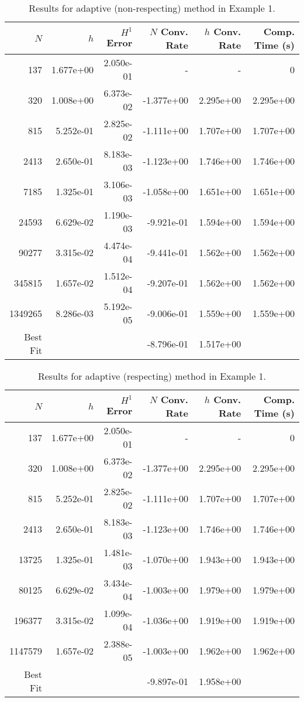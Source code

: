 \documentclass{article}
\begin{document}
\begin{table}
\begin{tabular}{|r|r|r|r|r|r|}
\hline
$N$&$h$&$H^1$ Error&$N$ Conv. Rate &$h$ Conv. Rate&Comp. Time (s)\\ 
\hline
\hline
137&1.677e+00&2.050e-01&-&-&0\\ 
320&1.008e+00&6.373e-02&-1.377e+00&2.295e+00&2.295e+00\\ 
815&5.252e-01&2.825e-02&-1.111e+00&1.707e+00&1.707e+00\\ 
2413&2.650e-01&8.183e-03&-1.123e+00&1.746e+00&1.746e+00\\ 
7185&1.325e-01&3.106e-03&-1.058e+00&1.651e+00&1.651e+00\\ 
24593&6.629e-02&1.190e-03&-9.921e-01&1.594e+00&1.594e+00\\ 
90277&3.315e-02&4.474e-04&-9.441e-01&1.562e+00&1.562e+00\\ 
345815&1.657e-02&1.512e-04&-9.207e-01&1.562e+00&1.562e+00\\ 
1349265&8.286e-03&5.192e-05&-9.006e-01&1.559e+00&1.559e+00\\
\hline 
Best Fit&&&-8.796e-01&1.517e+00&\\ 
\hline
\end{tabular}
\caption{Results for adaptive (non-respecting) method in Example 1.}
\label{tab:example1-adaptiveno43}
\end{table}

\begin{table}
\begin{tabular}{|r|r|r|r|r|r|}
\hline
$N$&$h$&$H^1$ Error&$N$ Conv. Rate &$h$ Conv. Rate&Comp. Time (s)\\ 
\hline
\hline
137&1.677e+00&2.050e-01&-&-&0\\ 
320&1.008e+00&6.373e-02&-1.377e+00&2.295e+00&2.295e+00\\ 
815&5.252e-01&2.825e-02&-1.111e+00&1.707e+00&1.707e+00\\ 
2413&2.650e-01&8.183e-03&-1.123e+00&1.746e+00&1.746e+00\\ 
13725&1.325e-01&1.481e-03&-1.070e+00&1.943e+00&1.943e+00\\ 
80125&6.629e-02&3.434e-04&-1.003e+00&1.979e+00&1.979e+00\\ 
196377&3.315e-02&1.099e-04&-1.036e+00&1.919e+00&1.919e+00\\ 
1147579&1.657e-02&2.388e-05&-1.003e+00&1.962e+00&1.962e+00\\
\hline 
Best Fit&&&-9.897e-01&1.958e+00&\\ 
\hline
\end{tabular}
\caption{Results for adaptive (respecting) method in Example 1.}
\label{tab:example1-adaptive}
\end{table}
\end{document}
